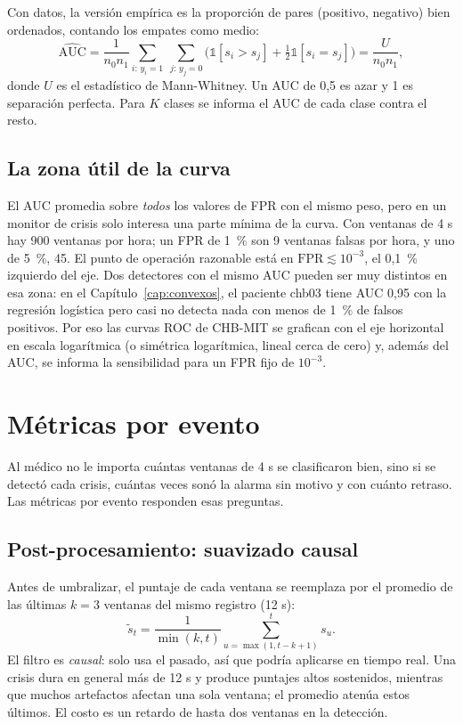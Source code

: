 Con datos, la versión empírica es la proporción de pares (positivo, negativo) bien ordenados, contando los empates
como medio:
\begin{equation}
  \widehat{\text{AUC}} = \frac{1}{n_0 n_1}\sum_{i:\,y_i = 1}\ \sum_{j:\,y_j = 0}
  \Big(\mathds{1}[s_i > s_j] + \tfrac12\mathds{1}[s_i = s_j]\Big) = \frac{U}{n_0 n_1},
  \label{eq:auc_mw}
\end{equation}
donde $U$ es el estadístico de Mann-Whitney. Un AUC de 0,5 es azar y 1 es separación perfecta. Para $K$ clases se
informa el AUC de cada clase contra el resto.

\subsection{La zona útil de la curva}
\label{sec:zona_util}

El AUC promedia sobre \emph{todos} los valores de FPR con el mismo peso, pero en un monitor de crisis solo interesa
una parte mínima de la curva. Con ventanas de 4 s hay 900 ventanas por hora; un FPR de 1~\% son 9 ventanas falsas por
hora, y uno de 5~\%, 45. El punto de operación razonable está en $\text{FPR} \lesssim 10^{-3}$, el 0,1~\% izquierdo
del eje. Dos detectores con el mismo AUC pueden ser muy distintos en esa zona: en el Capítulo~\ref{cap:convexos},
el paciente chb03 tiene AUC 0,95 con la regresión logística pero casi no detecta nada con menos de 1~\% de falsos
positivos. Por eso las curvas ROC de CHB-MIT se grafican con el eje horizontal en escala logarítmica (o simétrica
logarítmica, lineal cerca de cero) y, además del AUC, se informa la sensibilidad para un FPR fijo de $10^{-3}$.

\section{Métricas por evento}
\label{sec:eventos}

Al médico no le importa cuántas ventanas de 4 s se clasificaron bien, sino si se detectó cada crisis, cuántas veces
sonó la alarma sin motivo y con cuánto retraso. Las métricas por evento responden esas preguntas.

\subsection{Post-procesamiento: suavizado causal}

Antes de umbralizar, el puntaje de cada ventana se reemplaza por el promedio de las últimas $k = 3$ ventanas del mismo
registro (12 s):
\begin{equation}
  \tilde s_t = \frac{1}{\min(k, t)}\sum_{u = \max(1, t-k+1)}^{t} s_u.
\end{equation}
El filtro es \emph{causal}: solo usa el pasado, así que podría aplicarse en tiempo real. Una crisis dura en general
más de 12 s y produce puntajes altos sostenidos, mientras que muchos artefactos afectan una sola ventana; el promedio
atenúa estos últimos. El costo es un retardo de hasta dos ventanas en la detección.

